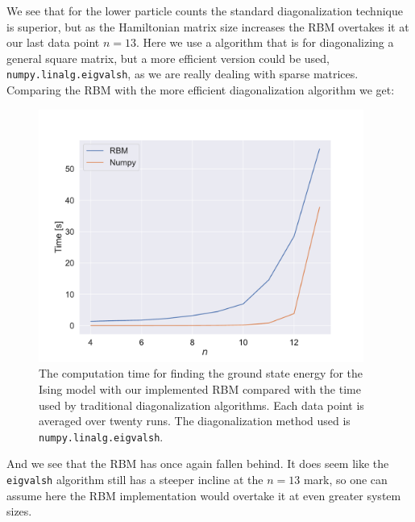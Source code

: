 We see that for the lower particle counts the standard diagonalization technique is superior, but as the Hamiltonian matrix size increases the RBM overtakes it at our last data point $n=13$. Here we use a algorithm that is for diagonalizing a general square matrix, but a more efficient version could be used, \texttt{numpy.linalg.eigvalsh}, as we are really dealing with sparse matrices. Comparing the RBM with the more efficient diagonalization algorithm we get:

\begin{figure}[H]
  \begin{center}
    \includegraphics[width=0.95\textwidth]{Figures/Plots/Ising/[particles][4-13][e=500][J=0.3][L=-0.4][eigvalsh]}
  \end{center}
  \caption{The computation time for finding the ground state energy for the Ising model with our implemented RBM compared with the time used by traditional diagonalization algorithms. Each data point is averaged over twenty runs. The diagonalization method used is \texttt{numpy.linalg.eigvalsh}.}
\end{figure}

And we see that the RBM has once again fallen behind. It does seem like the \texttt{eigvalsh} algorithm still has a steeper incline at the $n=13$ mark, so one can assume here the RBM implementation would overtake it at even greater system sizes.



